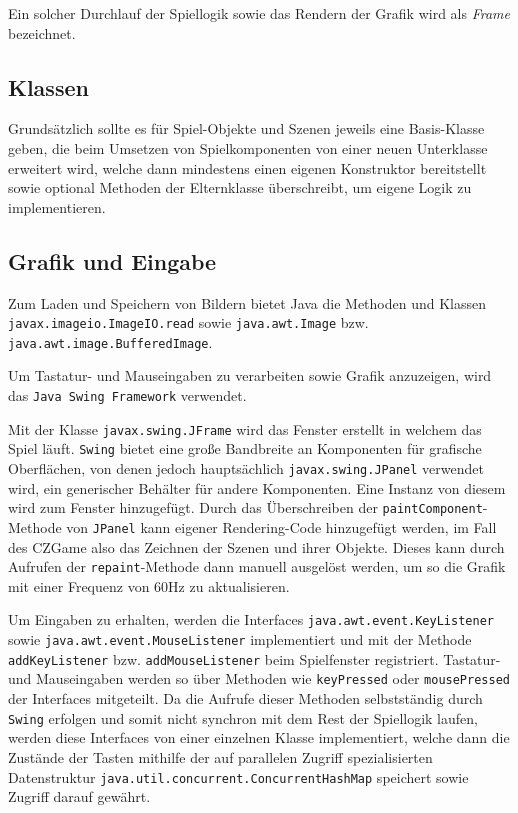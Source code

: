 Ein solcher Durchlauf der Spiellogik sowie das Rendern der Grafik
wird als \textit{Frame} bezeichnet.


\subsection{Klassen}

Grundsätzlich sollte es für Spiel-Objekte und Szenen jeweils eine
Basis-Klasse geben, die beim Umsetzen von Spielkomponenten von einer
neuen Unterklasse erweitert wird, welche dann mindestens einen eigenen
Konstruktor bereitstellt sowie optional Methoden der Elternklasse
überschreibt, um eigene Logik zu implementieren.


\subsection{Grafik und Eingabe} \label{idee:engine:grafik-eingabe}

\begin{sloppypar}

Zum Laden und Speichern von Bildern bietet Java die Methoden
und Klassen \texttt{javax.imageio.ImageIO.read} sowie
\texttt{java.awt.Image} bzw. \texttt{java.awt.image.BufferedImage}.

Um Tastatur- und Mauseingaben zu verarbeiten sowie Grafik
anzuzeigen, wird das \texttt{Java Swing Framework} verwendet.

Mit der Klasse \texttt{javax.swing.JFrame} wird das Fenster
erstellt in welchem das Spiel läuft. \texttt{Swing} bietet eine große
Bandbreite an Komponenten für grafische Oberflächen, von denen
jedoch hauptsächlich \texttt{javax.swing.JPanel} verwendet wird,
ein generischer Behälter für andere Komponenten. Eine Instanz von
diesem wird zum Fenster hinzugefügt. Durch das Überschreiben der
\texttt{paintComponent}-Methode von \texttt{JPanel} kann eigener
Rendering-Code hinzugefügt werden, im Fall des CZGame also
das Zeichnen der Szenen und ihrer Objekte. Dieses kann durch
Aufrufen der \texttt{repaint}-Methode dann manuell ausgelöst werden,
um so die Grafik mit einer Frequenz von 60Hz zu aktualisieren.

Um Eingaben zu erhalten, werden die Interfaces \texttt{java.awt.event.KeyListener}
sowie \texttt{java.awt.event.MouseListener} implementiert und mit
der Methode \texttt{addKeyListener} bzw. \texttt{addMouseListener}
beim Spielfenster registriert. Tastatur- und Mauseingaben werden
so über Methoden wie \texttt{keyPressed} oder \texttt{mousePressed}
der Interfaces mitgeteilt. Da die Aufrufe dieser Methoden selbstständig
durch \texttt{Swing} erfolgen und somit nicht synchron mit dem
Rest der Spiellogik laufen, werden diese Interfaces von einer einzelnen
Klasse implementiert, welche dann die Zustände der Tasten mithilfe der
auf parallelen Zugriff spezialisierten Datenstruktur
\texttt{java.util.concurrent.ConcurrentHashMap} speichert sowie
Zugriff darauf gewährt.
\end{sloppypar}


